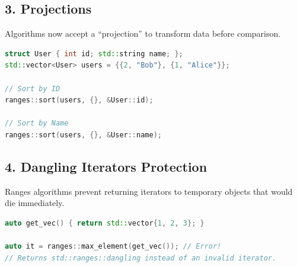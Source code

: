 \hypertarget{projections}{%
\subsection{3. Projections}\label{projections}}

Algorithms now accept a ``projection'' to transform data before
comparison.

\begin{lstlisting}[language={C++}]
struct User { int id; std::string name; };
std::vector<User> users = {{2, "Bob"}, {1, "Alice"}};

// Sort by ID
ranges::sort(users, {}, &User::id);

// Sort by Name
ranges::sort(users, {}, &User::name);
\end{lstlisting}

\hypertarget{dangling-iterators-protection}{%
\subsection{4. Dangling Iterators
Protection}\label{dangling-iterators-protection}}

Ranges algorithms prevent returning iterators to temporary objects that
would die immediately.

\begin{lstlisting}[language={C++}]
auto get_vec() { return std::vector{1, 2, 3}; }

auto it = ranges::max_element(get_vec()); // Error!
// Returns std::ranges::dangling instead of an invalid iterator.
\end{lstlisting}
